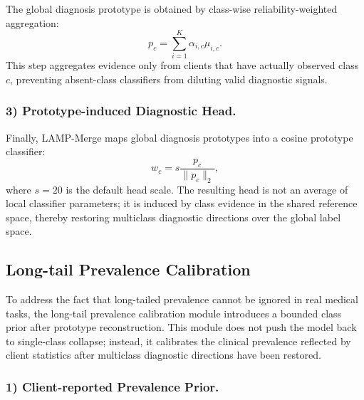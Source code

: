 \documentclass[letterpaper]{article} %
\begin{document}
The global diagnosis prototype is obtained by class-wise reliability-weighted aggregation:
\begin{equation}
p_c=\sum_{i=1}^{K}\alpha_{i,c}\mu_{i,c}.
\end{equation}
This step aggregates evidence only from clients that have actually observed class $c$, preventing absent-class classifiers from diluting valid diagnostic signals.

\subsubsection{3) Prototype-induced Diagnostic Head.}

Finally, LAMP-Merge maps global diagnosis prototypes into a cosine prototype classifier:
\begin{equation}
w_c=s\frac{p_c}{\|p_c\|_2},
\end{equation}
where $s=20$ is the default head scale. The resulting head is not an average of local classifier parameters; it is induced by class evidence in the shared reference space, thereby restoring multiclass diagnostic directions over the global label space.

\subsection{Long-tail Prevalence Calibration}

To address the fact that long-tailed prevalence cannot be ignored in real medical tasks, the long-tail prevalence calibration module introduces a bounded class prior after prototype reconstruction. This module does not push the model back to single-class collapse; instead, it calibrates the clinical prevalence reflected by client statistics after multiclass diagnostic directions have been restored.

\subsubsection{1) Client-reported Prevalence Prior.}
\end{document}
